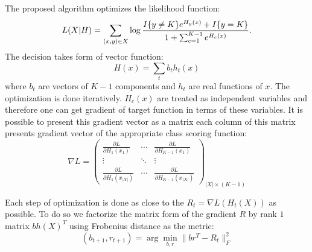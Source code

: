 \documentclass{article}
\begin{document}
The proposed algorithm optimizes the likelihood function:
\begin{multline*}
	L(X\arrowvert H) = \sum_{(x,y) \in X} \log \frac{ I\{y \ne K \}e^{H_y(x)} + I\{y=K\} }{ 1+\sum_{c=1}^{K-1} e^{H_c(x)} }.
\end{multline*}
The decision takes form of vector function:
\begin{equation}
H(x) = \sum_t b_{t} h_t(x) 
\end{equation}
where $b_t$ are vectors of $K-1$ components and $h_t$ are real functions of $x$. The optimization is done iteratively. $H_c(x)$ are treated as independent variables and therefore one can get gradient of target function in terms of these variables. It is possible to present this gradient vector as a matrix each column of this matrix presents gradient vector of the appropriate class scoring function:
\begin{equation}
\label{eq:grad_matrix}
\nabla L = 
\left(
\begin{array}{ccc}
	  \frac{ \partial L }{ \partial H_{1}(x_{1}) } 
	& \cdots 
	& \frac{ \partial L }{ \partial H_{K-1}(x_{1}) } \\

	  \vdots & \ddots & \vdots\\

	  \frac{ \partial L }{ \partial H_{1}(x_{|X|}) } 
	& \cdots 
	& \frac{ \partial L }{ \partial H_{K-1}(x_{|X|}) }
\end{array}
\right)_{|X| \times (K-1)}
\end{equation}

Each step of optimization is done as close to the $R_t = \nabla L(H_t(X))$ as possible. To do so we factorize the matrix form of the gradient $R$ by rank $1$ matrix $b h(X)^T$ using Frobenius distance as the metric:
\begin{equation}
(b_{t+1},r_{t+1}) = \arg \min_{b,r} \|b r^T - R_t\|_F^2
\label{eq:factorization_step}
\end{equation}
\end{document}
